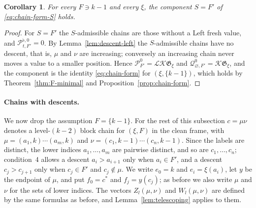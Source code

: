 \documentclass[11pt]{article}
\newtheorem{corollary}[proposition]{Corollary}
\newcommand{\G}{\mathfrak{G}}
\begin{document}
\begin{corollary}\label{cor:top-component}
For every $F\ni k-1$ and every $\xi$, the component $S=F'$ of
\eqref{eq:chain-form-S} holds.
\end{corollary}

\begin{proof}
For $S=F'$ the $S$-admissible chains are those without a Left fresh
value, and $\mathcal P^{\flat,0}_{t,F'}=0$. By
Lemma~\ref{lem:descent-left} the $S$-admissible chains have no
descent, that is, $\mu$ and $\nu$ are increasing; conversely an
increasing chain never moves a value to a smaller position. Hence
$\mathcal P^0_{F'}=\mathcal L\mathcal K\G_\xi$ and
$\mathcal Q^0_{\varnothing,F'}=\mathcal K\G_\xi$, and the component is
the identity \eqref{eq:chain-form} for $(\xi,\{k-1\})$, which holds by
Theorem~\ref{thm:F-minimal} and Proposition~\ref{prop:chain-form}.
\end{proof}

\paragraph{Chains with descents.}
We now drop the assumption $F=\{k-1\}$. For the rest of this
subsection $c=\mu\nu$ denotes a level-$(k-2)$ block chain for
$(\xi,F)$ in the clean frame, with $\mu=(a_1,k)\cdots(a_m,k)$ and
$\nu=(c_1,k-1)\cdots(c_n,k-1)$. Since the labels are distinct, the
lower indices $a_1,\ldots,a_m$ are pairwise distinct, and so are
$c_1,\ldots,c_n$; condition~4 allows a descent $a_i>a_{i+1}$ only when
$a_i\in F'$, and a descent $c_j>c_{j+1}$ only when $c_j\in F'$ and
$c_j\notin\mu$. We write $e_0=k$ and $e_i=\xi(a_i)$, let $y$ be the
endpoint of $\mu$, and put $f_0=c^\ast$ and $f_j=y(c_j)$; as before we
also write $\mu$ and $\nu$ for the sets of lower indices. The vectors
$Z_l(\mu,\nu)$ and $W_l(\mu,\nu)$ are defined by the same formulas as
before, and Lemma~\ref{lem:telescoping} applies to them.
\end{document}

